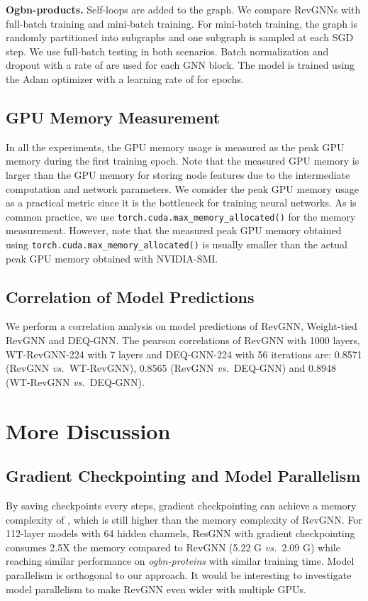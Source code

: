 \documentclass{article}
\newcommand{\vs}{\emph{vs.~}}
\newcommand{\mysection}[1]{\vspace{0pt}\noindent\textbf{#1.}}
\begin{document}
\mysection{Ogbn-products}
Self-loops are added to the graph. We compare RevGNNs with full-batch training and mini-batch training. For mini-batch training, the graph is randomly partitioned into  subgraphs and one subgraph is sampled at each SGD step. We use full-batch testing in both scenarios. Batch normalization and dropout with a rate of  are used for each GNN block. The model is trained using the Adam optimizer with a learning rate of  for  epochs.

\subsection{GPU Memory Measurement}
In all the experiments, the GPU memory usage is measured as the peak GPU memory during the first training epoch. Note that the measured GPU memory is larger than the GPU memory for storing node features due to the intermediate computation and network parameters. We consider the peak GPU memory usage as a practical metric since it is the bottleneck for training neural networks. As is common practice, we use \texttt{torch.cuda.max\_memory\_allocated()} for the memory measurement. However, note that the measured peak GPU memory obtained using \texttt{torch.cuda.max\_memory\_allocated()} is usually smaller than the actual peak GPU memory obtained with NVIDIA-SMI.

\subsection{Correlation of Model Predictions}
We perform a correlation analysis on model predictions of RevGNN, Weight-tied RevGNN and DEQ-GNN. The pearson correlations of RevGNN with 1000 layers, WT-RevGNN-224 with 7 layers and DEQ-GNN-224 with 56 iterations are: 0.8571 (RevGNN \vs WT-RevGNN), 0.8565 (RevGNN \vs DEQ-GNN) and 0.8948 (WT-RevGNN \vs DEQ-GNN).

\section{More Discussion}

\subsection{Gradient Checkpointing and Model Parallelism}
By saving checkpoints every  steps, gradient checkpointing can achieve a memory complexity of , which is still higher than the memory complexity  of RevGNN. For 112-layer models with 64 hidden channels, ResGNN with gradient checkpointing consumes 2.5X the memory compared to RevGNN (5.22 G \vs 2.09 G) while reaching similar performance on \emph{ogbn-proteins} with similar training time.
Model parallelism is orthogonal to our approach. It would be interesting to investigate model parallelism to make RevGNN even wider with multiple GPUs.
\end{document}
